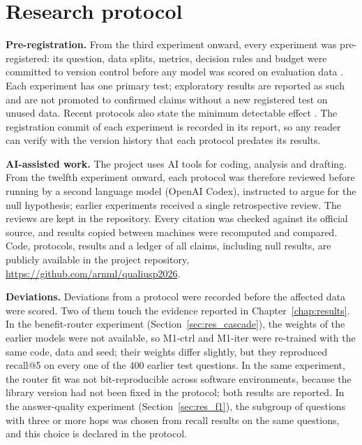 \section{Research protocol}
\label{sec:protocol}

\textbf{Pre-registration.} From the third experiment onward, every experiment was pre-registered: its question, data splits, metrics, decision rules and budget were committed to version control before any model was scored on evaluation data \cite{nosek2018preregistration}. Each experiment has one primary test; exploratory results are reported as such and are not promoted to confirmed claims without a new registered test on unused data. Recent protocols also state the minimum detectable effect \cite{card2020power}. The registration commit of each experiment is recorded in its report, so any reader can verify with the version history that each protocol predates its results.

\textbf{AI-assisted work.} The project uses AI tools for coding, analysis and drafting. From the twelfth experiment onward, each protocol was therefore reviewed before running by a second language model (OpenAI Codex), instructed to argue for the null hypothesis; earlier experiments received a single retrospective review. The reviews are kept in the repository. Every citation was checked against its official source, and results copied between machines were recomputed and compared. Code, protocols, results and a ledger of all claims, including null results, are publicly available in the project repository, \url{https://github.com/arnml/qualiusp2026}.

\textbf{Deviations.} Deviations from a protocol were recorded before the affected data were scored. Two of them touch the evidence reported in Chapter~\ref{chap:results}. In the benefit-router experiment (Section~\ref{sec:res_cascade}), the weights of the earlier models were not available, so M1-ctrl and M1-iter were re-trained with the same code, data and seed; their weights differ slightly, but they reproduced recall@5 on every one of the 400 earlier test questions. In the same experiment, the router fit was not bit-reproducible across software environments, because the library version had not been fixed in the protocol; both results are reported. In the answer-quality experiment (Section~\ref{sec:res_f1}), the subgroup of questions with three or more hops was chosen from recall results on the same questions, and this choice is declared in the protocol.
